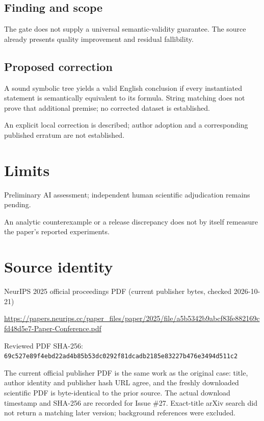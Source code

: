 \documentclass[11pt]{article}
\begin{document}
\subsection*{Finding and scope}

The gate does not supply a universal semantic-validity guarantee. The source already presents quality improvement and residual fallibility.

\subsection*{Proposed correction}

A sound symbolic tree yields a valid English conclusion if every instantiated statement is semantically equivalent to its formula. String matching does not prove that additional premise; no corrected dataset is established.

An explicit local correction is described; author adoption and a corresponding published erratum are not established.

\section*{Limits}

Preliminary AI assessment; independent human scientific adjudication remains pending.\par

An analytic counterexample or a release discrepancy does not by itself remeasure the paper’s reported experiments.\par

\section*{Source identity}

NeurIPS 2025 official proceedings PDF (current publisher bytes, checked 2026-10-21)

\url{https://papers.neurips.cc/paper_files/paper/2025/file/a5b5342b9abcf83fe882169cfd48d5e7-Paper-Conference.pdf}

Reviewed PDF SHA-256: \nolinkurl{69c527e89f4ebd22ad4b85b53dc0292f81dcadb2185e83227b476e3494d511c2}

The current official publisher PDF is the same work as the original case: title, author identity and publisher hash URL agree, and the freshly downloaded scientific PDF is byte-identical to the prior source. The actual download timestamp and SHA-256 are recorded for Issue \#27. Exact-title arXiv search did not return a matching later version; background references were excluded.
\end{document}
